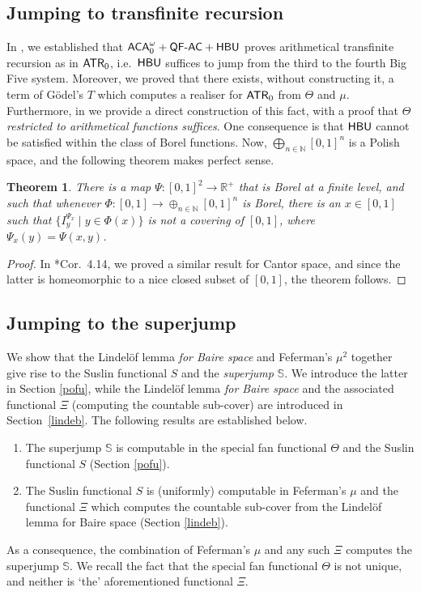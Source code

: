 \documentclass[reqno]{amsart}
\newtheorem{theorem}[thm]{Theorem}
\def\ATR{\textup{\textsf{ATR}}}
\def\ACAo{\textup{\textsf{ACA}}_{0}^{\omega}}
\def\N{{\mathbb  N}}
\def\R{{\mathbb  R}}
\def\QFAC{\textup{\textsf{QF-AC}}}
\def\HBU{\textup{\textsf{HBU}}}
\def\SJ{\mathbb{S}}
\numberwithin{equation}{section}
\numberwithin{thm}{section}
\begin{document}
\subsection{Jumping to transfinite recursion}\label{RMR1} 
In \cite{dagsam}, we established that $\ACAo+\QFAC+\HBU$ proves arithmetical transfinite recursion as in $\ATR_{0}$, i.e.\ $\HBU$ suffices to jump from the third to the fourth Big Five system. 
Moreover, we proved that there exists, without constructing it, a term of G\"odel's $T$ which computes a realiser for $\ATR_{0}$ from $\Theta$ and $\mu$.  
Furthermore, in \cite{dagsamII} we provide a direct construction of this fact, with a proof that $\Theta$ \emph{restricted to arithmetical functions suffices}.  
One consequence is that $\HBU$ cannot be satisfied within the class of Borel functions.
Now, $\bigoplus_{n \in \N}[0,1]^n$ is a Polish space, and the following theorem makes perfect sense. 
\begin{theorem}\label{thm.3.22} 
There is a  map $\Psi:[0,1]^2 \rightarrow \R^+$ that is Borel  at a finite level, and such that whenever $\Phi:[0,1] \rightarrow \oplus_{n \in \N}[0,1]^n$ is Borel, there is an $x \in [0,1]$ such that $\{I^{\Psi_x}_y \mid y \in \Phi(x)\}$ is not a covering of $[0,1]$, where $\Psi_x(y) = \Psi(x,y)$.
\end{theorem}
\begin{proof}
In \cite{dagsamII}*{Cor.\ 4.14}, we proved a similar result for Cantor space, and since the latter is homeomorphic to a nice closed subset of $[0,1]$, the theorem follows. 
\end{proof}

\subsection{Jumping to the superjump}\label{RMR2}
We show that the Lindel\"of lemma \emph{for Baire space} and Feferman's $\mu^{2}$ together give rise to the Suslin functional $S$ and the \emph{superjump} $\SJ$.  
We introduce the latter in Section \ref{pofu}, while the Lindel\"of lemma \emph{for Baire space}
 and the associated functional $\Xi$ (computing the countable sub-cover) are introduced in Section~\ref{lindeb}.  
The following results are established below.
\begin{enumerate}
\item The superjump $\SJ$ is computable in the special fan functional $\Theta$ and the Suslin functional $S$ (Section \ref{pofu}).
\item The Suslin functional $S$ is (uniformly) computable in Feferman's $\mu$ and the functional $\Xi$ which computes the countable sub-cover from the Lindel\"of lemma for Baire space (Section \ref{lindeb}).
\end{enumerate}
As a consequence, the combination of Feferman's $\mu$ and any such $\Xi$ computes the superjump $\SJ$.
We recall the fact that the special fan functional $\Theta$ is not unique, and neither is `the' aforementioned functional $\Xi$.
\end{document}
